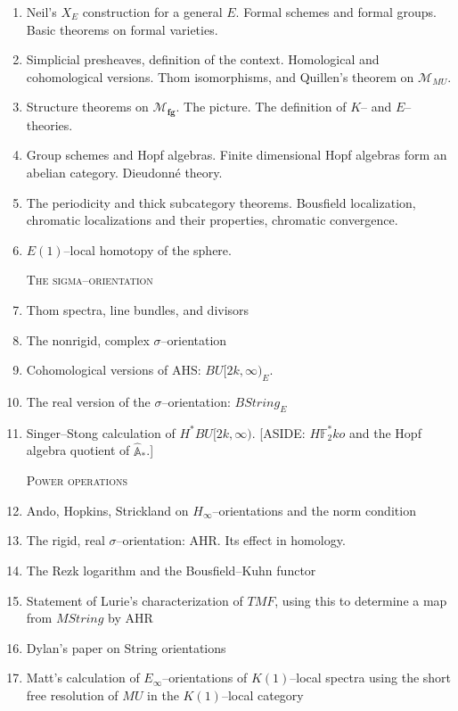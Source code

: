 \documentclass[12pt]{book}
\newcommand{\F}{\mathbb F}
\newcommand{\A}{\widehat{\mathbb{A}}}
\newcommand{\<}{\langle}
\renewcommand{\>}{\rangle}
\newcommand{\context}[1]{\mathcal{M}_{#1}}
\newcommand{\moduli}[1]{\mathcal{M}_{\mathbf{#1}}}
\newcommand{\String}{\mathit{String}}
\newcommand{\TMF}{\mathit{TMF}}
\newcommand{\MU}{\mathit{MU}}
\numberwithin{equation}{section}
\theoremstyle{plain}
\theoremstyle{definition}
\theoremstyle{remark}
\begin{document}
\begin{enumerate}

\item Neil's $X_E$ construction for a general $E$. Formal schemes and formal groups. Basic theorems on formal varieties.
\item Simplicial presheaves, definition of the context. Homological and cohomological versions. Thom isomorphisms, and Quillen's theorem on $\context{\MU}$.
\item Structure theorems on $\moduli{fg}$. The picture. The definition of $K$-- and $E$--theories.
\item Group schemes and Hopf algebras. Finite dimensional Hopf algebras form an abelian category. Dieudonn\'e theory.
\item The periodicity and thick subcategory theorems. Bousfield localization, chromatic localizations and their properties, chromatic convergence.
\item $E(1)$--local homotopy of the sphere.

\textsc{The sigma--orientation}

\item Thom spectra, line bundles, and divisors
\item The nonrigid, complex $\sigma$--orientation
\item Cohomological versions of AHS: $BU[2k, \infty)_E$.
\item The real version of the $\sigma$--orientation: $B\String_E$
\item Singer--Stong calculation of $H^* BU[2k, \infty)$. [ASIDE: $H\F_2^* ko$ and the Hopf algebra quotient of $\A_*$.]

\textsc{Power operations}

\item Ando, Hopkins, Strickland on $H_\infty$--orientations and the norm condition
\item The rigid, real $\sigma$--orientation: AHR. Its effect in homology.
\item The Rezk logarithm and the Bousfield--Kuhn functor
\item Statement of Lurie's characterization of $\TMF$, using this to determine a map from $M\String$ by AHR
\item Dylan's paper on String orientations
\item Matt's calculation of $E_\infty$--orientations of $K(1)$--local spectra using the short free resolution of $MU$ in the $K(1)$--local category


\end{enumerate}
\end{document}
